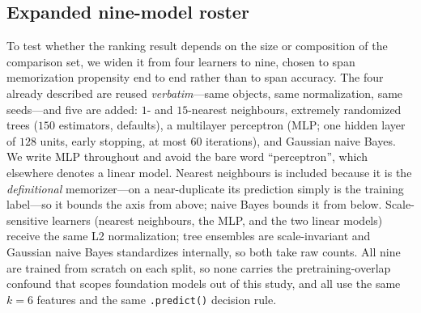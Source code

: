 \documentclass[webpdf,modern,large,namedate]{oup-authoring-template}%
\begin{document}
\subsection{Expanded nine-model roster}\label{sec:m-roster}
To test whether the ranking result depends on the size or composition of the comparison set, we widen it from four learners to nine, chosen to span memorization propensity end to end rather than to span accuracy. The four already described are reused \emph{verbatim}---same objects, same normalization, same seeds---and five are added: $1$- and $15$-nearest neighbours, extremely randomized trees ($150$ estimators, defaults), a multilayer perceptron (MLP; one hidden layer of $128$ units, early stopping, at most $60$ iterations), and Gaussian naive Bayes. We write MLP throughout and avoid the bare word ``perceptron'', which elsewhere denotes a linear model. Nearest neighbours is included because it is the \emph{definitional} memorizer---on a near-duplicate its prediction simply is the training label---so it bounds the axis from above; naive Bayes bounds it from below. Scale-sensitive learners (nearest neighbours, the MLP, and the two linear models) receive the same L2 normalization; tree ensembles are scale-invariant and Gaussian naive Bayes standardizes internally, so both take raw counts. All nine are trained from scratch on each split, so none carries the pretraining-overlap confound that scopes foundation models out of this study, and all use the same $k=6$ features and the same \texttt{.predict()} decision rule.
\end{document}
